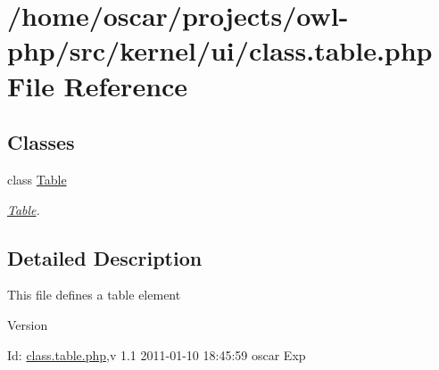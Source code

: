 \section{/home/oscar/projects/owl-\/php/src/kernel/ui/class.table.php File Reference}
\label{class_8table_8php}
\subsection*{Classes}
\begin{DoxyCompactItemize}
\item 
class \hyperlink{classTable}{Table}
\begin{DoxyCompactList}\small\item\em \hyperlink{classTable}{Table}. \item\end{DoxyCompactList}\end{DoxyCompactItemize}


\subsection{Detailed Description}
This file defines a table element \begin{DoxyVersion}{Version}

\end{DoxyVersion}
\begin{DoxyParagraph}{Id:}
\hyperlink{class_8table_8php}{class.table.php},v 1.1 2011-\/01-\/10 18:45:59 oscar Exp 
\end{DoxyParagraph}
